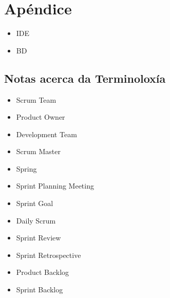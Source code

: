 \chapter{Apéndice}


\begin{itemize}
 \item {IDE}
 \item {BD}
\end{itemize}




\section{Notas acerca da Terminoloxía}
\begin{itemize}
	\item{Scrum Team}
	\item{Product Owner}
	\item{Development Team}
	\item{Scrum Master}
	\item{Spring}
	\item{Sprint Planning Meeting}
	\item{Sprint Goal}
	\item{Daily Scrum}
	\item{Sprint Review}
	\item{Sprint Retrospective}
	\item{Product Backlog}
	\item{Sprint Backlog}
	
	
\end{itemize}
